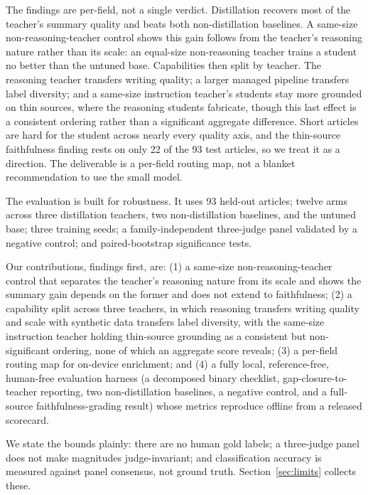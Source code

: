 \documentclass[10pt,journal]{IEEEtran}
\begin{document}
The findings are per-field, not a single verdict. Distillation recovers most of the teacher's summary quality and beats both non-distillation baselines. A same-size non-reasoning-teacher control shows this gain follows from the teacher's reasoning nature rather than its scale: an equal-size non-reasoning teacher trains a student no better than the untuned base. Capabilities then split by teacher. The reasoning teacher transfers writing quality; a larger managed pipeline transfers label diversity; and a same-size instruction teacher's students stay more grounded on thin sources, where the reasoning students fabricate, though this last effect is a consistent ordering rather than a significant aggregate difference. Short articles are hard for the student across nearly every quality axis, and the thin-source faithfulness finding rests on only 22 of the 93 test articles, so we treat it as a direction. The deliverable is a per-field routing map, not a blanket recommendation to use the small model.

The evaluation is built for robustness. It uses 93 held-out articles; twelve arms across three distillation teachers, two non-distillation baselines, and the untuned base; three training seeds; a family-independent three-judge panel validated by a negative control; and paired-bootstrap significance tests.

Our contributions, findings first, are: (1) a same-size non-reasoning-teacher control that separates the teacher's reasoning nature from its scale and shows the summary gain depends on the former and does not extend to faithfulness; (2) a capability split across three teachers, in which reasoning transfers writing quality and scale with synthetic data transfers label diversity, with the same-size instruction teacher holding thin-source grounding as a consistent but non-significant ordering, none of which an aggregate score reveals; (3) a per-field routing map for on-device enrichment; and (4) a fully local, reference-free, human-free evaluation harness (a decomposed binary checklist, gap-closure-to-teacher reporting, two non-distillation baselines, a negative control, and a full-source faithfulness-grading result) whose metrics reproduce offline from a released scorecard.

We state the bounds plainly: there are no human gold labels; a three-judge panel does not make magnitudes judge-invariant; and classification accuracy is measured against panel consensus, not ground truth. Section~\ref{sec:limits} collects these.
\end{document}
